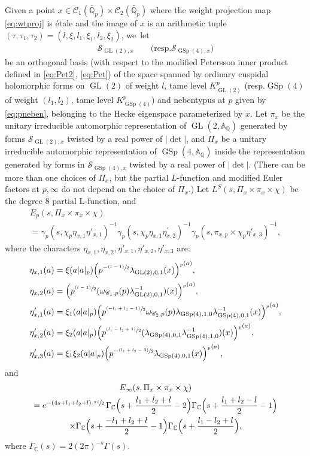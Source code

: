 \documentclass[10pt]{amsart}
\newcommand{\resp}{resp.}
\newcommand{\NoChangel}[1]{%
\expandafter\let\csname old\string#1\endcsname=#1
\let#1=\relax
\newcommand{#1}{\mathop{\mathcode`l="716C\csname old\string#1\endcsname\mathcode`l="7160}\displaylimits}%
}
\newcommand{\psfrac}[2]{\sfrac{(#1)}{#2}}
\newcommand{\Lfunction}{$L$\nobreakdash-func\-tion\xspace}
\theoremstyle{plain}
\theoremstyle{remark}
\newcommand{\bA}{\mathbb{A}}
\newcommand{\bC}{\mathbb{C}}
\newcommand{\bQ}{\mathbb{Q}}
\newcommand{\sC}{\mathscr{C}}
\newcommand{\sS}{\mathscr{S}}
\DeclareMathOperator{\GL}{GL}
\DeclareMathOperator{\GSp}{GSp}
\newcommand{\val}{\mathrm{val}}\NoChangel{\val}
\begin{document}
Given a point $x\in \sC_1(\bar{\bQ}_p)\times\sC_2(\bar{\bQ}_p)$ where the weight projection map \eqref{eq:wtproj} is \'{e}tale and the image of $x$ is an arithmetic tuple $(\tau,\tau_1,\tau_2)=(l,\xi,l_1,\xi_1,l_2,\xi_2)$, we~let
\begin{align*}
\sS_{\GL(2),x}\qquad\text{(\resp $\sS_{\GSp(4),x}$)}
\end{align*}
be an orthogonal basis (with respect to the modified Petersson inner product defined in \eqref{eq:Pet2}, \eqref{eq:Pet}) of the space spanned by ordinary cuspidal holomorphic forms on $\GL(2)$ of weight $l$, tame level $K^p_{\GL(2)}$ (\resp $\GSp(4)$ of weight $(l_1,l_2)$, tame level $K^p_{\GSp(4)}$) and nebentypus at $p$ given by \eqref{eq:pneben}, belonging to the Hecke eigenspace parameterized by $x$. Let $\pi_x$ be the unitary irreducible automorphic representation of $\GL(2,\bA_\bQ)$ generated by forms $\sS_{\GL(2),x}$ twisted by a real power of $|\det|$, and $\Pi_x$ be a unitary irreducible automorphic representation of $\GSp(4,\bA_\bQ)$ inside the representation generated by forms in $\sS_{\GSp(4),x}$ twisted by a real power of $|\det|$. (There can be more than one choices of $\Pi_x$, but the partial \Lfunction and modified Euler factors at $p,\infty$ do not depend on the choice of $\Pi_x$.) Let $L^S(s,\Pi_x\times\pi_x\times\chi)$ be the degree $8$ partial L-function, and
\begin{multline} \label{eq:Ep}
E_p(s,\Pi_x\times\pi_x\times\chi)\\
=\gamma_p(s,\chi_p\eta_{x,1}\eta'_{x,1})^{-1} \gamma_p(s,\chi_p\eta_{x,1}\eta^{\prime}_{x,2})^{-1}
\gamma_p(s,\pi_{x,p}\times\chi_p\eta'_{x,3})^{-1},
\end{multline}
where the characters $\eta_{x,1},\eta_{x,2},\eta'_{x,1},\eta'_{x,2},\eta'_{x,3}$ are:
\begin{equation}\label{eq:etas}
\begin{aligned}
\eta_{x,1}(a)&=\xi(a|a|_p) \Bigl(p^{-\psfrac{l-1}{2}}\lambda_{\GL(2),0,1}(x)\Bigr)^{\val_p(a)},\\
\eta_{x,2}(a)&=\Bigl(p^{\psfrac{l-1}{2}}(\omega_{\sC_1,p}(p)\lambda^{-1}_{\GL(2),0,1})(x)\Bigr)^{\val_p(a)},\\
\eta'_{x,1}(a)&=\xi_1(a|a|_p)\Bigl(p^{\psfrac{-l_1+l_2-1}{2}} \omega_{\sC_2,p}(p)\lambda_{\GSp(4),1,0}\lambda_{\GSp(4),0,1}^{-1}(x)\Bigr)^{\val_p(a)},\\
\eta'_{x,2}(a)&=\xi_2(a|a|_p)\Bigl(p^{\psfrac{l_1-l_2+1}{2}} (\lambda_{\GSp(4),0,1}\lambda_{\GSp(4),1,0}^{-1})(x)\Bigr)^{\val_p(a)},\\
\eta'_{x,3}(a)&=\xi_1\xi_2(a|a|_p)\Bigl(p^{-\psfrac{l_1+l_2-3}{2}}\lambda_{\GSp(4),0,1}(x)\Bigr)^{\val_p(a)},
\end{aligned}
\end{equation}
and
\begin{multline}\label{eq:Einf}
E_\infty(s,\Pi_x\times\pi_x\times\chi)\\
=e^{-(4s+l_1+l_2+l)\cdot \sfrac{\pi i}{2}}\,\Gamma_\bC\Bigl(s+\frac{l_1+l_2+l}{2}-2\Bigr)\Gamma_\bC\Bigl(s+\frac{l_1+l_2-l}{2}-1\Bigr)\\
\times\Gamma_\bC\Bigl(s+\frac{-l_1+l_2+l}{2}-1\Bigr)\Gamma_\bC\Bigl(s+\frac{l_1-l_2+l}{2}\Bigr),
\end{multline}
where $\Gamma_\bC(s)=2(2\pi)^{-s}\Gamma(s)$.
\end{document}
